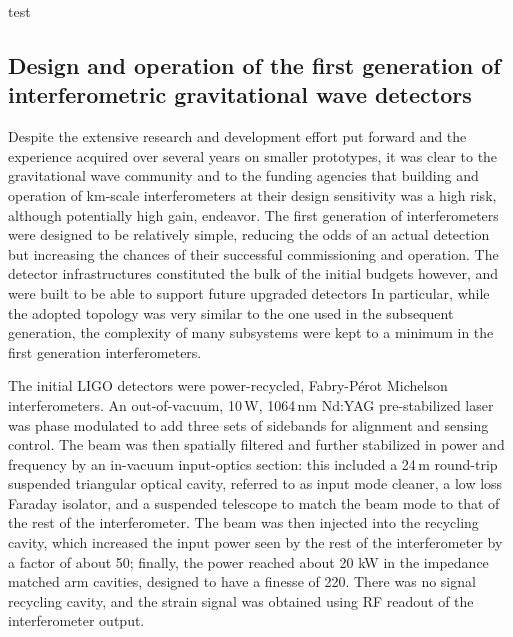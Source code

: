 test\subsection{Design and operation of the first generation of interferometric gravitational wave detectors}\label{subsec:1stgen}

Despite the extensive research and development effort put forward and the experience acquired over several years on smaller prototypes, it was clear to the gravitational wave community and to the funding agencies that building and operation of km-scale interferometers at their design sensitivity was a high risk, although potentially high gain, endeavor.
The first generation of interferometers were designed to be relatively simple, reducing the odds of an actual detection but increasing the chances of their successful commissioning and operation.
The detector infrastructures constituted the bulk of the initial budgets however, and were built to be able to support future upgraded detectors
In particular, while the adopted topology was very similar to the one used in the subsequent generation, the complexity of many subsystems were kept to a minimum in the first generation interferometers.

The initial LIGO detectors\cite{Abbott_2004,Abbott_2009} were power-recycled, Fabry-P\'{e}rot Michelson interferometers.
An out-of-vacuum, 10\,W, 1064\,nm Nd:YAG pre-stabilized laser was phase modulated to add three sets of sidebands for alignment and sensing control.
The beam was then spatially filtered and further stabilized in power and frequency by an in-vacuum input-optics section: this included a 24\,m round-trip suspended triangular optical cavity, referred to as input mode cleaner, a low loss Faraday isolator, and a suspended telescope to match the beam mode to that of the rest of the interferometer.
The beam was then injected into the recycling cavity,
which increased the input power seen by the rest of the interferometer by a factor of about 50; finally, the power reached about 20 kW in the impedance matched arm cavities, designed to have a finesse of 220. There was no signal recycling cavity, and the strain signal was obtained using RF readout of the interferometer output.

